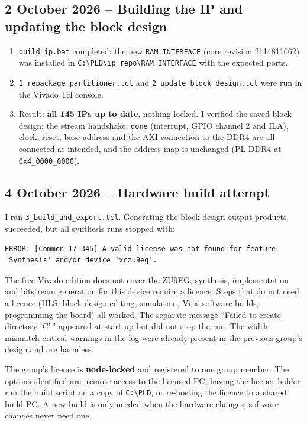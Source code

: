 \documentclass[11pt,a4paper]{article}
\newcommand{\code}[1]{\texttt{#1}}
\begin{document}
\subsection{2 October 2026 -- Building the IP and updating the block design}
\begin{enumerate}
  \item \code{build\_ip.bat} completed: the new \code{RAM\_INTERFACE} (core revision 2114811662) was installed in \code{C:\textbackslash PLD\textbackslash ip\_repo\textbackslash RAM\_INTERFACE} with the expected ports.
  \item \code{1\_repackage\_partitioner.tcl} and \code{2\_update\_block\_design.tcl} were run in the Vivado Tcl console.
  \item Result: \textbf{all 145 IPs up to date}, nothing locked. I verified the saved block design: the stream handshake, \code{done} (interrupt, GPIO channel 2 and ILA), clock, reset, base address and the AXI connection to the DDR4 are all connected as intended, and the address map is unchanged (PL DDR4 at \code{0x4\_0000\_0000}).
\end{enumerate}

\subsection{4 October 2026 -- Hardware build attempt}
I ran \code{3\_build\_and\_export.tcl}. Generating the block design output products succeeded, but all synthesis runs stopped with:
\begin{lstlisting}
ERROR: [Common 17-345] A valid license was not found for feature
'Synthesis' and/or device 'xczu9eg'.
\end{lstlisting}
The free Vivado edition does not cover the ZU9EG; synthesis, implementation and bitstream generation for this device require a licence. Steps that do not need a licence (HLS, block-design editing, simulation, Vitis software builds, programming the board) all worked. The separate message ``Failed to create directory 'C'\,'' appeared at start-up but did not stop the run. The width-mismatch critical warnings in the log were already present in the previous group's design and are harmless.

The group's licence is \textbf{node-locked} and registered to one group member. The options identified are: remote access to the licensed PC, having the licence holder run the build script on a copy of \code{C:\textbackslash PLD}, or re-hosting the licence to a shared build PC. A new build is only needed when the hardware changes; software changes never need one.
\end{document}

